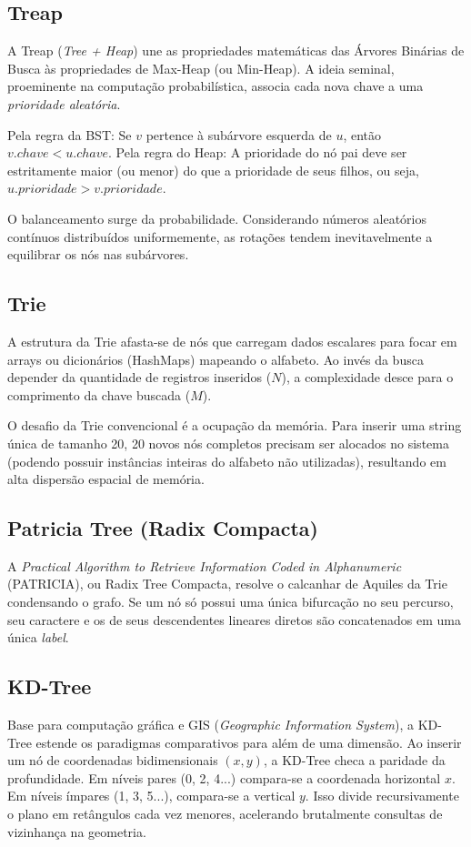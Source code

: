 \documentclass[12pt,a4paper]{article}
\begin{document}
\subsection{Treap}
A Treap (\textit{Tree + Heap}) une as propriedades matemáticas das Árvores Binárias de Busca às propriedades de Max-Heap (ou Min-Heap). A ideia seminal, proeminente na computação probabilística, associa cada nova chave a uma \textit{prioridade aleatória}.

Pela regra da BST: Se $v$ pertence à subárvore esquerda de $u$, então $v.chave < u.chave$. Pela regra do Heap: A prioridade do nó pai deve ser estritamente maior (ou menor) do que a prioridade de seus filhos, ou seja, $u.prioridade > v.prioridade$.

O balanceamento surge da probabilidade. Considerando números aleatórios contínuos distribuídos uniformemente, as rotações tendem inevitavelmente a equilibrar os nós nas subárvores.

\subsection{Trie}
A estrutura da Trie afasta-se de nós que carregam dados escalares para focar em arrays ou dicionários (HashMaps) mapeando o alfabeto. Ao invés da busca depender da quantidade de registros inseridos ($N$), a complexidade desce para o comprimento da chave buscada ($M$). 

O desafio da Trie convencional é a ocupação da memória. Para inserir uma string única de tamanho 20, 20 novos nós completos precisam ser alocados no sistema (podendo possuir instâncias inteiras do alfabeto não utilizadas), resultando em alta dispersão espacial de memória.

\subsection{Patricia Tree (Radix Compacta)}
A \textit{Practical Algorithm to Retrieve Information Coded in Alphanumeric} (PATRICIA), ou Radix Tree Compacta, resolve o calcanhar de Aquiles da Trie condensando o grafo. Se um nó só possui uma única bifurcação no seu percurso, seu caractere e os de seus descendentes lineares diretos são concatenados em uma única \textit{label}. 

\subsection{KD-Tree}
Base para computação gráfica e GIS (\textit{Geographic Information System}), a KD-Tree estende os paradigmas comparativos para além de uma dimensão. Ao inserir um nó de coordenadas bidimensionais $(x, y)$, a KD-Tree checa a paridade da profundidade. Em níveis pares (0, 2, 4...) compara-se a coordenada horizontal $x$. Em níveis ímpares (1, 3, 5...), compara-se a vertical $y$. Isso divide recursivamente o plano em retângulos cada vez menores, acelerando brutalmente consultas de vizinhança na geometria.
\end{document}
